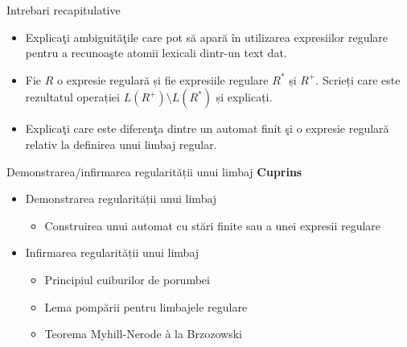 \documentclass[pdf]{beamer}
\begin{document}
\begin{frame}{Intrebari recapitulative}
\begin{itemize}

\item
Explicaţi ambiguităţile care pot să apară în utilizarea expresiilor regulare pentru a recunoaşte atomii lexicali dintr-un text dat.
\newline

\item
Fie $R$ o expresie regulară și fie expresiile regulare $R^*$ și $R^+$. Scrieți care este rezultatul operației $L(R^+)\setminus L(R^*)$ și explicați.
\newline

\item
Explicaţi care este diferenţa dintre un automat finit şi o expresie regulară relativ la definirea unui limbaj regular.
\newline

\end{itemize}
\end{frame}






\begin{frame}{Demonstrarea/infirmarea regularității unui limbaj}
\textbf{Cuprins}
\begin{itemize}
\item
Demonstrarea regularității unui limbaj
\begin{itemize}
\item
Construirea unui automat cu stări finite sau a unei expresii regulare
\end{itemize}
\item
Infirmarea regularității unui limbaj
\begin{itemize}
\item
Principiul cuiburilor de porumbei
\item
Lema pompării pentru limbajele regulare
\item
Teorema Myhill-Nerode à la Brzozowski
\end{itemize}
\end{itemize}
\end{frame}
\end{document}
